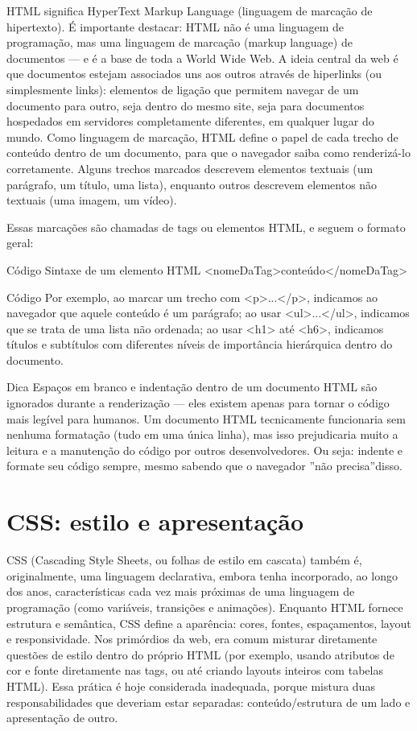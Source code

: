 HTML significa HyperText Markup Language (linguagem de marcação de hipertexto). É importante destacar: HTML não é uma linguagem de programação, mas uma linguagem de marcação (markup language) de documentos — e é a base de toda a World Wide Web. A ideia central da web é que documentos estejam associados uns aos outros através de hiperlinks (ou simplesmente links): elementos de ligação que permitem navegar de um documento para outro, seja dentro do mesmo site, seja para documentos hospedados em servidores completamente diferentes, em qualquer lugar do mundo. Como linguagem de marcação, HTML define o papel de cada trecho de conteúdo dentro de um documento, para que o navegador saiba como renderizá-lo corretamente. Alguns trechos marcados descrevem elementos textuais (um parágrafo, um título, uma lista), enquanto outros descrevem elementos não textuais (uma imagem, um vídeo).

Essas marcações são chamadas de tags ou elementos HTML, e seguem o formato geral:

\begin{codebox}{Código}
Sintaxe de um elemento HTML
<nomeDaTag>conteúdo</nomeDaTag>
\end{codebox}

\begin{codebox}{Código}
Por exemplo, ao marcar um trecho com <p>...</p>, indicamos ao navegador que
aquele conteúdo é um parágrafo; ao usar <ul>...</ul>, indicamos que se trata de
uma lista não ordenada; ao usar <h1> até <h6>, indicamos títulos e subtítulos com
diferentes níveis de importância hierárquica dentro do documento.
\end{codebox}

\begin{infobox}{Dica}
Espaços em branco e indentação dentro de um documento HTML são ignorados durante a renderização — eles existem apenas para tornar o código mais legível para humanos. Um documento HTML tecnicamente funcionaria sem nenhuma formatação (tudo em uma única linha), mas isso prejudicaria muito a leitura e a manutenção do código por outros desenvolvedores. Ou seja: indente e formate seu código sempre, mesmo sabendo que o navegador ”não precisa”disso.
\end{infobox}

\section{CSS: estilo e apresentação}

CSS (Cascading Style Sheets, ou folhas de estilo em cascata) também é, originalmente, uma linguagem declarativa, embora tenha incorporado, ao longo dos anos, características cada vez mais próximas de uma linguagem de programação (como variáveis, transições e animações). Enquanto HTML fornece estrutura e semântica, CSS define a aparência: cores, fontes, espaçamentos, layout e responsividade. Nos primórdios da web, era comum misturar diretamente questões de estilo dentro do próprio HTML (por exemplo, usando atributos de cor e fonte diretamente nas tags, ou até criando layouts inteiros com tabelas HTML). Essa prática é hoje considerada inadequada, porque mistura duas responsabilidades que deveriam estar separadas: conteúdo/estrutura de um lado e apresentação de outro.

